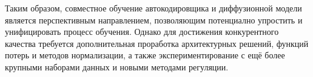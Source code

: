 \documentclass[12pt,a4paper]{article}
\begin{document}
Таким образом, совместное обучение автокодировщика и диффузионной модели является перспективным направлением, позволяющим потенциално упростить и унифицировать процесс обучения. Однако для достижения конкурентного качества требуется дополнительная проработка архитектурных решений, функций потерь и методов нормализации, а также экспериментирование с ещё более крупными наборами данных и новыми методами регуляции.

\end{document}
